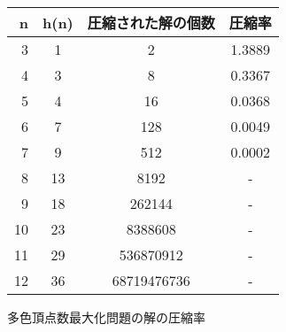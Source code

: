 \begin{tabular}{r|c|c|c}
 \hline
 n& h(n)& 圧縮された解の個数& 圧縮率 \\
 \hline
 3&	1&	2&	1.3889 \\
 4&	3&	8&	0.3367 \\
 5&	4&	16&	0.0368 \\
 6&	7&	128&	0.0049 \\
 7&	9&	512&	0.0002 \\
 8&	13&	8192&	- \\
 9&	18&	262144&	- \\
 10&	23&	8388608&	- \\
 11&	29&	536870912&	- \\
 12&	36&	68719476736&	- \\
\end{tabular}
\caption{多色頂点数最大化問題の解の圧縮率}
\label{table:com}